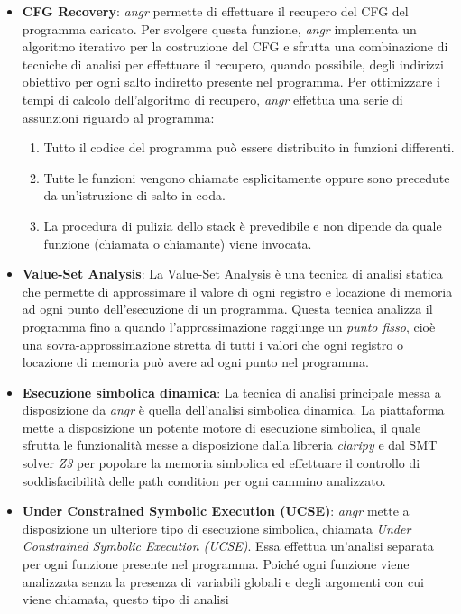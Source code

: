 \documentclass[../main.tex]{subfiles}
\begin{document}
\begin{itemize}
    \item \textbf{CFG Recovery}: \textit{angr} permette di effettuare il recupero del CFG del programma caricato. Per svolgere questa funzione, \textit{angr} implementa un algoritmo iterativo per la costruzione del CFG e sfrutta una combinazione
    di tecniche di analisi per effettuare il recupero, quando possibile, degli indirizzi obiettivo per ogni salto indiretto presente nel programma. Per ottimizzare i tempi di calcolo dell'algoritmo di recupero, \textit{angr} effettua una serie di assunzioni riguardo
    al programma:
    \begin{enumerate}
        \item Tutto il codice del programma può essere distribuito in funzioni differenti.
        \item Tutte le funzioni vengono chiamate esplicitamente oppure sono precedute da un'istruzione di salto in coda.
        \item La procedura di pulizia dello stack è prevedibile e non dipende da quale funzione (chiamata o chiamante) viene invocata.
    \end{enumerate}
    \item \textbf{Value-Set Analysis}: La Value-Set Analysis è una tecnica di analisi statica che permette di approssimare il valore di ogni registro e locazione di memoria ad ogni punto dell'esecuzione di un programma.
    Questa tecnica analizza il programma fino a quando l'approssimazione raggiunge un \textit{punto fisso}, cioè una sovra-approssimazione stretta di tutti i valori che ogni registro o locazione di memoria può avere ad ogni punto nel programma.
    \item \textbf{Esecuzione simbolica dinamica}: La tecnica di analisi principale messa a disposizione da \textit{angr} è quella dell'analisi simbolica dinamica. La piattaforma mette a disposizione un potente motore di esecuzione simbolica, il quale sfrutta
    le funzionalità messe a disposizione dalla libreria \textit{claripy} e dal SMT solver \textit{Z3} per popolare la memoria simbolica ed effettuare il controllo di soddisfacibilità delle path condition per ogni cammino analizzato.
    \item \textbf{Under Constrained Symbolic Execution (UCSE)}: \textit{angr} mette a disposizione un ulteriore tipo di esecuzione simbolica, chiamata \textit{Under Constrained Symbolic Execution (UCSE)}. Essa effettua un'analisi separata per ogni funzione presente nel programma. Poiché ogni funzione viene analizzata senza la presenza di variabili globali e degli argomenti con cui viene chiamata, questo tipo di analisi

\end{itemize}
\end{document}
